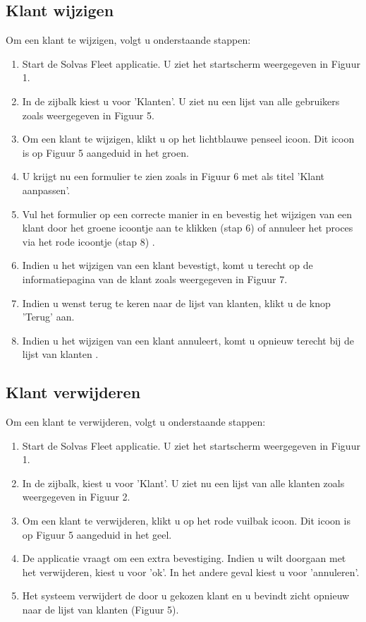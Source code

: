 \documentclass[11pt,openany]{article}
\begin{document}
\subsection{Klant wijzigen}
Om een klant te wijzigen, volgt u onderstaande stappen:
\begin{enumerate}
	\item Start de Solvas Fleet applicatie. U ziet het startscherm weergegeven in Figuur 1.
	\item In de zijbalk kiest u voor 'Klanten'. U ziet nu een lijst van alle gebruikers zoals weergegeven in Figuur 5.
	\item Om een klant te wijzigen, klikt u op het lichtblauwe penseel icoon. Dit icoon is op Figuur 5 aangeduid in het groen.
	\item U krijgt nu een formulier te zien zoals in Figuur 6 met als titel 'Klant aanpassen'.
	\item Vul het formulier op een correcte manier in en bevestig het wijzigen van een klant door het groene icoontje aan te klikken (stap 6) of annuleer het proces via het rode icoontje (stap 8) .
	\item Indien u het wijzigen van een klant bevestigt, komt u terecht op de informatiepagina van de klant zoals weergegeven in Figuur 7. 
	\item Indien u wenst terug te keren  naar de lijst van klanten, klikt u de knop 'Terug' aan.
	\item Indien u het wijzigen van een klant annuleert, komt u opnieuw terecht bij de lijst van klanten .
\end{enumerate}

\subsection{Klant verwijderen}
Om een klant te verwijderen, volgt u onderstaande stappen:
\begin{enumerate}
	\item Start de Solvas Fleet applicatie. U ziet het startscherm weergegeven in Figuur 1.
	\item In de zijbalk, kiest u voor 'Klant'. U ziet nu een lijst van alle klanten zoals weergegeven in Figuur 2.
	\item Om een klant te verwijderen, klikt u op het rode vuilbak icoon. Dit icoon is op Figuur 5 aangeduid in het geel.
	\item De applicatie vraagt om een extra bevestiging. Indien u wilt doorgaan met het verwijderen, kiest u voor 'ok'. In het andere geval kiest u voor 'annuleren'.
	\item Het systeem verwijdert de door u gekozen klant en u bevindt zicht opnieuw naar de lijst van klanten (Figuur 5).
\end{enumerate}
\end{document}
